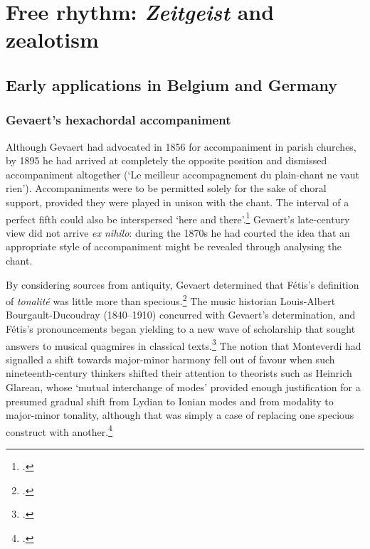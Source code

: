 \chapter{Free rhythm: \emph{Zeitgeist} and zealotism}
\section{Early applications in Belgium and Germany}
\subsection{Gevaert's hexachordal accompaniment}
\label{hl:gevaert_1895}\label{ln:gevaert_hexachordal}%
Although Gevaert had advocated in 1856 for accompaniment in parish churches, by 1895 he had arrived at completely the opposite position and dismissed accompaniment altogether (`Le meilleur accompagnement du plain-chant ne vaut rien').
Accompaniments were to be permitted solely for the sake of choral support, provided they were played in unison with the chant.
The interval of a perfect fifth could also be interspersed `here and there'.\footcite[125]{Gevaertmelopeeantiquedans1895}
Gevaert's late-century view did not arrive \emph{ex nihilo}: during the 1870s he had courted the idea that an appropriate style of accompaniment might be revealed through analysing the chant.

By considering sources from antiquity, Gevaert determined that Fétis's definition of \emph{tonalité} was little more than specious.\footcite[73]{ChristensenStoriesTonalityAge2019}
The music historian Louis-Albert Bourgault-Ducoudray (1840--1910) concurred with Gevaert's determination, and Fétis's pronouncements began yielding to a new wave of scholarship that sought answers to musical quagmires in classical texts.\footcite[59]{Bourgault-DucoudrayEtudesmusiqueecclesiastique1877}
The notion that Monteverdi had signalled a shift towards major-minor harmony fell out of favour when such nineteenth-century thinkers shifted their attention to theorists such as Heinrich Glarean, whose `mutual interchange of modes' provided enough justification for a presumed gradual shift from Lydian to Ionian modes and from modality to major-minor tonality, although that was simply a case of replacing one specious construct with another.\footcite[129]{GlareanDodecachordon1965}
\nowidow[2]

